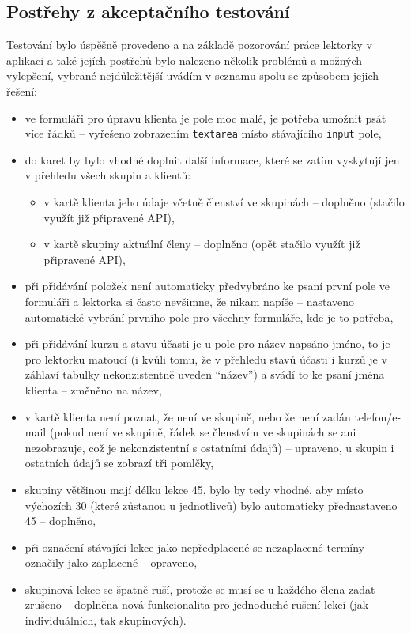         \subsection{Postřehy z akceptačního testování}
        Testování bylo úspěšně provedeno a na základě pozorování práce lektorky v aplikaci a také jejích postřehů bylo nalezeno několik problémů a možných vylepšení, vybrané nejdůležitější uvádím v seznamu spolu se způsobem jejich řešení:
            \begin{itemize}
                \item ve formuláři pro úpravu klienta je pole moc malé, je potřeba umožnit psát více řádků -- vyřešeno zobrazením \verb|textarea| místo stávajícího \verb|input| pole,
                \item do karet by bylo vhodné doplnit další informace, které se zatím vyskytují jen v přehledu všech skupin a klientů:
                \begin{itemize}
                    \item v kartě klienta jeho údaje včetně členství ve skupinách -- doplněno (stačilo využít již připravené API),
                    \item v kartě skupiny aktuální členy -- doplněno (opět stačilo využít již připravené API),
                \end{itemize} 
                \item při přidávání položek není automaticky předvybráno ke psaní první pole ve formuláři a lektorka si často nevšimne, že nikam napíše -- nastaveno automatické vybrání prvního pole pro všechny formuláře, kde je to potřeba,
                \item při přidávání kurzu a stavu účasti je u pole pro název napsáno jméno, to je pro lektorku matoucí (i kvůli tomu, že v přehledu stavů účasti i kurzů je v záhlaví tabulky nekonzistentně uveden \enquote{název}) a svádí to ke psaní jména klienta -- změněno na název,
                \item v kartě klienta není poznat, že není ve skupině, nebo že není zadán telefon/e-mail (pokud není ve skupině, řádek se členstvím ve skupinách se ani nezobrazuje, což je nekonzistentní s ostatními údajů) -- upraveno, u skupin i ostatních údajů se zobrazí tři pomlčky,
                \item skupiny většinou mají délku lekce 45, bylo by tedy vhodné, aby místo výchozích 30 (které zůstanou u jednotlivců) bylo automaticky přednastaveno 45 -- doplněno,
                \item při označení stávající lekce jako nepředplacené se nezaplacené termíny označily jako zaplacené -- opraveno,
                \item skupinová lekce se špatně ruší, protože se musí se u každého člena zadat zrušeno -- doplněna nová funkcionalita pro jednoduché rušení lekcí (jak individuálních, tak skupinových).
            \end{itemize}
        
